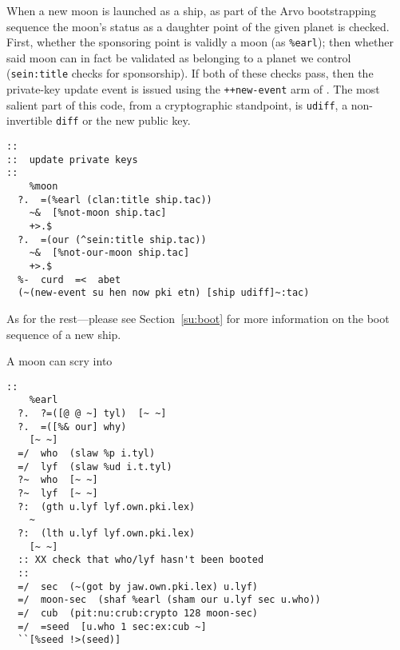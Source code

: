 
When a new moon is launched as a ship, as part of the Arvo bootstrapping sequence the moon's status as a daughter point of the given planet is checked.  First, whether the sponsoring point is validly a moon (as \texttt{\%earl}); then whether said moon can in fact be validated as belonging to a planet we control (\texttt{sein:title} checks for sponsorship).  If both of these checks pass, then the private-key update event is issued using the \texttt{++new-event} arm of \jael.  The most salient part of this code, from a cryptographic standpoint, is \texttt{udiff}, a non-invertible \texttt{diff} or the new public key.


\begin{lstlisting}
::
::  update private keys
::
    %moon
  ?.  =(%earl (clan:title ship.tac))
    ~&  [%not-moon ship.tac]
    +>.$
  ?.  =(our (^sein:title ship.tac))
    ~&  [%not-our-moon ship.tac]
    +>.$
  %-  curd  =<  abet
  (~(new-event su hen now pki etn) [ship udiff]~:tac)
\end{lstlisting}

As for the rest—please see Section~\ref{su:boot} for more information on the boot sequence of a new ship.

A moon can scry into \jael

\begin{lstlisting}
::
    %earl
  ?.  ?=([@ @ ~] tyl)  [~ ~]
  ?.  =([%& our] why)
    [~ ~]
  =/  who  (slaw %p i.tyl)
  =/  lyf  (slaw %ud i.t.tyl)
  ?~  who  [~ ~]
  ?~  lyf  [~ ~]
  ?:  (gth u.lyf lyf.own.pki.lex)
    ~
  ?:  (lth u.lyf lyf.own.pki.lex)
    [~ ~]
  :: XX check that who/lyf hasn't been booted
  ::
  =/  sec  (~(got by jaw.own.pki.lex) u.lyf)
  =/  moon-sec  (shaf %earl (sham our u.lyf sec u.who))
  =/  cub  (pit:nu:crub:crypto 128 moon-sec)
  =/  =seed  [u.who 1 sec:ex:cub ~]
  ``[%seed !>(seed)]
\end{lstlisting}

